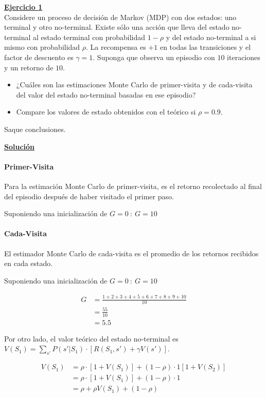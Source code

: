 \indent\underline{\textbf{Ejercicio 1}}\\
Considere un proceso de decisión de Markov (MDP) con dos estados: uno terminal y otro no-terminal.
Existe sólo una acción que lleva del estado no-terminal al estado terminal con probabilidad $1 - \rho$ y del estado no-terminal a si mismo con probabilidad $\rho$.
La recompensa es $+1$ en todas las transiciones y el factor de descuento es $\gamma = 1$.
Suponga que observa un episodio con $10$ iteraciones y un retorno de $10$.

\begin{itemize}
    \item ¿Cuáles son las estimaciones Monte Carlo de primer-visita y de cada-visita del valor del estado no-terminal basadas en ese episodio?
    \item Compare los valores de estado obtenidos con el teórico si $\rho = 0.9$.
\end{itemize}

Saque conclusiones.

\indent\underline{\textbf{Solución}}
\paragraph{Primer-Visita}
Para la estimación Monte Carlo de primer-visita, es el retorno recolectado al final del episodio después de haber visitado el primer paso.

Suponiendo una inicialización de $G=0 \ : \ G=10$

\paragraph{Cada-Visita}
El estimador Monte Carlo de cada-visita es el promedio de los retornos recibidos en cada estado.

Suponiendo una inicialización de $G=0 \ : \ G=10$

\begin{align*}
    G &= \frac{1 + 2 + 3 + 4 + 5 + 6 + 7 + 8 + 9 + 10}{10} \\
    &= \frac{55}{10} \\
    &= 5.5
\end{align*}

Por otro lado, el valor teórico del estado no-terminal es $V(S_1) = \sum_{s'} P \left(s' | S_1\right) \cdot \left[R \left(S_1,s'\right) + \gamma V(s')\right]$.

\begin{align*}
    V(S_1) &= \rho \cdot \left[1 + V(S_1)\right] + (1 - \rho) \cdot 1 \left[1 + V(S_2)\right] \\
    &= \rho \cdot \left[1 + V(S_1)\right] + (1 - \rho) \cdot 1 \\
    &= \rho + \rho V(S_1) + \left(1 - \rho \right)
\end{align*}


